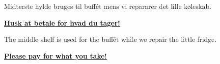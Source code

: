 \documentclass{article}
\begin{document}
\maketitle

\null
\vspace{-1cm}

\begin{center}

\huge

\vspace{-0.5cm}

\huge

Midterste hylde bruges til buffét mens vi repararer det lille
køleskab.

\medskip

\textbf{\underline{Husk at betale for hvad du tager!}}

\vspace{1cm}

\english

\huge

\vspace{-0.8cm}

\huge

The middle shelf is used for the buffét while we repair the little fridge.

\medskip

\textbf{\underline{Please pay for what you take!}}

\end{center}

\underskriv
\end{document}
